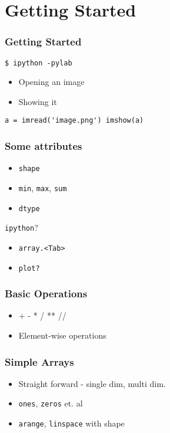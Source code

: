 \documentclass[presentation]{beamer}
\begin{document}
\section{Getting Started}
\label{sec-2}
\begin{frame}[fragile]
\frametitle{Getting Started}
\label{sec-2_1}


\begin{lstlisting}
$ ipython -pylab
\end{lstlisting}


\begin{itemize}
\item Opening an image
\item Showing it
\end{itemize}
\begin{lstlisting}
a = imread('image.png') imshow(a)
\end{lstlisting}
\end{frame}
\begin{frame}
\frametitle{Some attributes}
\label{sec-2_2}

\begin{itemize}
\item \texttt{shape}
\item \texttt{min}, \texttt{max}, \texttt{sum}
\item \texttt{dtype}
\end{itemize}

    \texttt{ipython}?

\begin{itemize}
\item \texttt{array.<Tab>}
\item \texttt{plot?}
\end{itemize}
\end{frame}
\begin{frame}
\frametitle{Basic Operations}
\label{sec-2_3}


\begin{itemize}
\item + - * / ** //
\item Element-wise operations
\end{itemize}
\end{frame}
\begin{frame}
\frametitle{Simple Arrays}
\label{sec-2_4}



\begin{itemize}
\item Straight forward - single dim, multi dim.
\item \texttt{ones}, \texttt{zeros} et. al
\item \texttt{arange}, \texttt{linspace} with shape
\end{itemize}
\end{frame}
\end{document}
